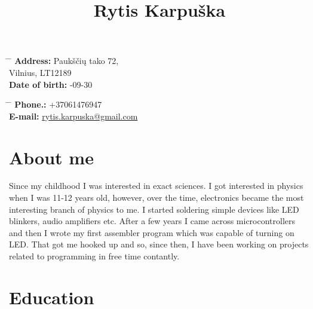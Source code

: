 \documentclass[12]{article}
\begin{document}
\title{Rytis Karpuška}


\parbox{0.5\textwidth}{ %
\begin{tabbing} %
\hspace{3cm} \= \hspace{4cm} \= \kill %
{\bf Address:} \> Paukščių tako 72,\\ %
\> Vilnius, LT12189\\ %
{\bf Date of birth:} -09-30\\ %
\end{tabbing}}
\hfill %
\parbox{0.5\textwidth}{ %
\begin{tabbing} %
\hspace{3cm} \= \hspace{4cm} \= \kill %
{\bf Phone.:} \> +37061476947 \\ %
{\bf E-mail:} \> \href{mailto:rytis.karpuska@gmail.com}{rytis.karpuska@gmail.com} \\ %
\end{tabbing}}

\section{About me}

Since my childhood I was interested in exact sciences.
I got interested in physics when I was 11-12 years old, however, over the time, electronics became the most interesting branch of physics to me.
I started soldering simple devices like LED blinkers, audio amplifiers etc.
After a few years I came across microcontrollers and then I wrote my first assembler program which was capable of turning on LED.
That got me hooked up and so, since then, I have been working on projects related to programming in free time contantly.

\section{Education}

\end{document}
